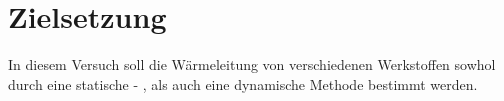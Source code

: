 \section{Zielsetzung}
In diesem Versuch soll die Wärmeleitung von verschiedenen Werkstoffen sowhol durch 
eine statische - , als auch eine dynamische Methode bestimmt werden.